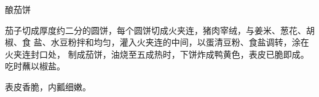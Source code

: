 %
%
%
%
%
%
%
\begin{recipe}{酿茄饼}

\ingredients


\preparation

茄子切成厚度约二分的圆饼，每个圆饼切成火夹连，猪肉宰绒，与姜米、葱花、胡椒、食
盐、水豆粉拌和均匀，灌入火夹连的中间，以蛋清豆粉、食盐调转，涂在火夹连封口处，
制成茄饼，油烧至五成热时，下饼炸成鸭黄色，表皮已脆即成。吃时蘸以椒盐。

\features

表皮香脆，内瓤细嫩。

\end{recipe}

